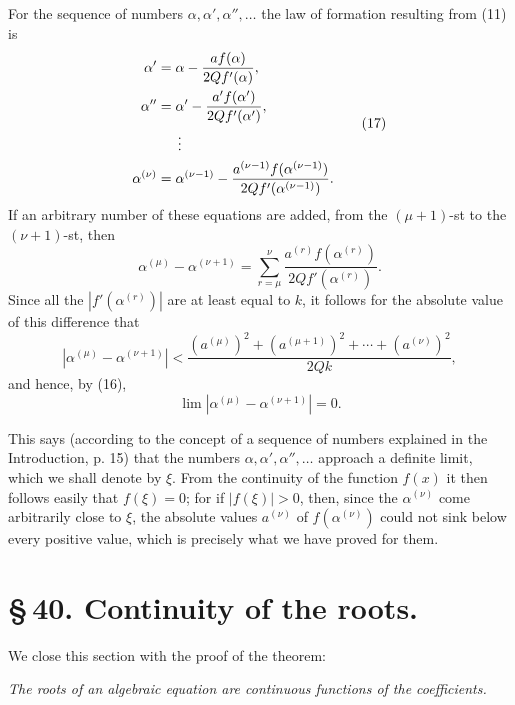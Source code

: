 \documentclass[11pt]{article}
\begin{document}
For the sequence of numbers $\alpha,\alpha',\alpha'',\ldots$ the law of formation resulting from (11) is
\begin{equation}
\begin{aligned}
 \alpha'&=\alpha-\frac{a f(\alpha)}{2Q f'(\alpha)},\\
 \alpha''&=\alpha'-\frac{a' f(\alpha')}{2Q f'(\alpha')},\\
 &\hspace{1.5em}\vdots\\
 \alpha^{(\nu)}&=\alpha^{(\nu-1)}-
 \frac{a^{(\nu-1)} f(\alpha^{(\nu-1)})}{2Q f'(\alpha^{(\nu-1)})}.
\end{aligned}
\tag{17}
\end{equation}
If an arbitrary number of these equations are added, from the $(\mu+1)$-st to the $(\nu+1)$-st, then
\begin{equation}
 \alpha^{(\mu)}-\alpha^{(\nu+1)}=
 \sum_{r=\mu}^{\nu}\frac{a^{(r)}f(\alpha^{(r)})}{2Q f'(\alpha^{(r)})}.
\tag{18}
\end{equation}
Since all the $|f'(\alpha^{(r)})|$ are at least equal to $k$, it follows for the absolute value of this difference that
\begin{equation}
 |\alpha^{(\mu)}-\alpha^{(\nu+1)}|<
 \frac{(a^{(\mu)})^2+(a^{(\mu+1)})^2+\cdots+(a^{(\nu)})^2}{2Qk},
\tag{19}
\end{equation}
and hence, by (16),
\begin{equation}
 \lim |\alpha^{(\mu)}-\alpha^{(\nu+1)}|=0.
\tag{20}
\end{equation}

This says (according to the concept of a sequence of numbers explained in the Introduction, p. 15) that the numbers $\alpha,\alpha',\alpha'',\ldots$ approach a definite limit, which we shall denote by $\xi$. From the continuity of the function $f(x)$ it then follows easily that $f(\xi)=0$; for if $|f(\xi)|>0$, then, since the $\alpha^{(\nu)}$ come arbitrarily close to $\xi$, the absolute values $a^{(\nu)}$ of $f(\alpha^{(\nu)})$ could not sink below every positive value, which is precisely what we have proved for them.


\section*{\S\,40. Continuity of the roots.}

We close this section with the proof of the theorem:

\begin{center}
\emph{The roots of an algebraic equation are continuous functions of the coefficients.}
\end{center}
\end{document}
